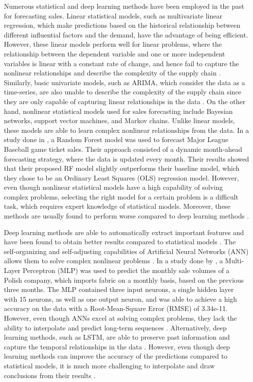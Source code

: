 Numerous statistical and deep learning methods have been employed in the past for forecasting sales.
Linear statistical models, such as multivariate linear regression, which make predictions based on the historical relationship between different influential factors and the demand, have the advantage of being efficient. 
However, these linear models perform well for linear problems, where the relationship between the dependent variable and one or more independent variables is linear with a constant rate of change, and hence fail to capture the nonlinear relationships and describe the complexity of the supply chain \cite{c5}.
Similarly, basic univariate models, such as ARIMA, which consider the data as a time-series, are also unable to describe the complexity of the supply chain since they are only capable of capturing linear relationships in the data \cite{c5, c1}.
On the other hand, nonlinear statistical models used for sales forecasting include Bayesian networks, support vector machines, and Markov chains. 
Unlike linear models, these models are able to learn complex nonlinear relationships from the data.
In a study done in \cite{c10}, a Random Forest model was used to forecast Major League Baseball game ticket sales.
Their approach consisted of a dynamic month-ahead forecasting strategy, where the data is updated every month. 
Their results showed that their proposed RF model slightly outperforms their baseline model, which they chose to be an Ordinary Least Squares (OLS) regression model.
However, even though nonlinear statistical models have a high capability of solving complex problems, selecting the right model for a certain problem is a difficult task, which requires expert knowledge of statistical models. 
Moreover, these methods are usually found to perform worse compared to deep learning methods \cite{c5}. 

Deep learning methods are able to automatically extract important features and have been found to obtain better results compared to statistical models \cite{c5}. 
The self-organizing and self-adjusting capabilities of Artificial Neural Networks (ANN) allows them to solve complex nonlinear problems \cite{c7}.  
In a study done by \cite{c9}, a Multi-Layer Perceptron (MLP) was used to predict the monthly sale volumes of a Polish company, which imports fabric on a monthly basis, based on the previous three months.
The MLP contained three input neurons, a single hidden layer with 15 neurons, as well as one output neuron, and was able to achieve a high accuracy on the data with a Root-Mean-Square Error (RMSE) of 3.34e-11.
However, even though ANNs excel at solving complex problems, they lack the ability to interpolate and predict long-term sequences \cite{c7}.
Alternatively, deep learning methods, such as LSTM, are able to preserve past information and capture the temporal relationships in the data \cite{c6}.
However, even though deep learning methods can improve the accuracy of the predictions compared to statistical models, it is much more challenging to interpolate and draw conclusions from their results \cite{c5, c9}. 

